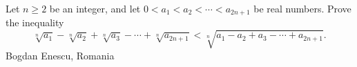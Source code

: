 Let $n\geq 2$ be an integer, and let $0 < a_1 < a_2 < \cdots < a_{2n+1}$ be real numbers. Prove the inequality\[ \sqrt[n]{a_1} - \sqrt[n]{a_2} + \sqrt[n]{a_3} - \cdots + \sqrt[n]{a_{2n+1}} < \sqrt[n]{a_1 - a_2 + a_3 - \cdots + a_{2n+1}}.  \]Bogdan Enescu, Romania